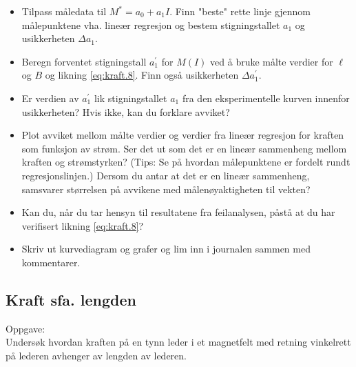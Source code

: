 \documentclass[../Elmag-labhefte-2020.tex]{subfiles}
\begin{document}
\vspace{-4mm} 
\begin{itemize}
    \item Tilpass måledata til $M^\ast = a_0 + a_1 I$. Finn "beste" rette linje gjennom målepunktene vha. lineær regresjon og bestem stigningstallet $a_1$ og usikkerheten $\Delta a_1$.
    \item Beregn forventet stigningstall $a_1^\prime$ for $M(I)$ ved å bruke målte verdier for $\ell$ og $B$ og likning \eqref{eq:kraft.8}. Finn også usikkerheten $\Delta a_1^\prime$.
    \item Er verdien av $a_1^\prime$ lik stigningstallet $a_1$ fra den eksperimentelle kurven innenfor usikkerheten? Hvis ikke, kan du forklare avviket?
    \item Plot avviket mellom målte verdier og verdier fra lineær regresjon for kraften som funksjon av strøm. Ser det ut som det er en lineær sammenheng mellom kraften og strømstyrken? (Tips: Se på hvordan målepunktene er fordelt rundt regresjonslinjen.) Dersom du antar at det er en lineær sammenheng, samsvarer størrelsen på avvikene med målenøyaktigheten til vekten?%
    \item Kan du, når du tar hensyn til resultatene fra feilanalysen, påstå at du har verifisert likning \eqref{eq:kraft.8}?
    \item Skriv ut kurvediagram og grafer og lim inn i journalen sammen med kommentarer.
\end{itemize}

\subsection{Kraft sfa. lengden \label{ch.kraft.lengde} }

Oppgave: \\
{\itsf Undersøk hvordan kraften på en tynn leder i et magnetfelt med retning vinkelrett på lederen avhenger av lengden av lederen.}
\end{document}
